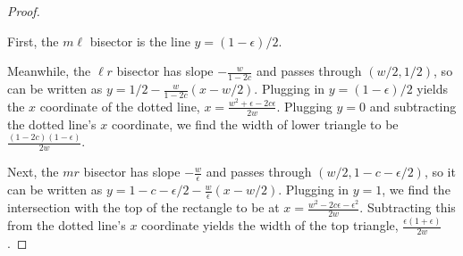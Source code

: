 \documentclass{article}
\theoremstyle{theorem}
\theoremstyle{definition}
\begin{document}
\begin{proof}
\begin{center}
\end{center}

First, the $m\ell$ bisector is the line $y = (1-\epsilon) / 2$. 

Meanwhile, the $\ell r$ bisector has slope $ -\frac{w}{1-2c}$ and passes through $(w/2, 1/2)$, so can be written as $y = 1/2 -\frac{w}{1-2c}(x - w/2)$. Plugging in $y = (1-\epsilon)/2$ yields the $x$ coordinate of the dotted line, $x = \frac{w^2 + \epsilon - 2c\epsilon}{2w}$. Plugging $y = 0$ and subtracting the dotted line's $x$ coordinate, we find the width of lower triangle to be $\frac{(1-2 c) (1-\epsilon)}{2 w}$. 

Next, the $mr$ bisector has slope $-\frac{w}{\epsilon}$ and passes through $(w/2, 1 - c - \epsilon /2)$, so it can be written as $y  = 1 - c - \epsilon / 2 - \frac{w}{\epsilon}(x - w/2) $. Plugging in $y = 1$, we find the intersection with the top of the rectangle to be at $x =  \frac{w^2 -2 c \epsilon -\epsilon ^2}{2 w}. $ Subtracting this from the dotted line's $x$ coordinate yields the width of the top triangle, $ \frac{\epsilon  (1+\epsilon)}{2 w}$.


\end{proof}
\end{document}
